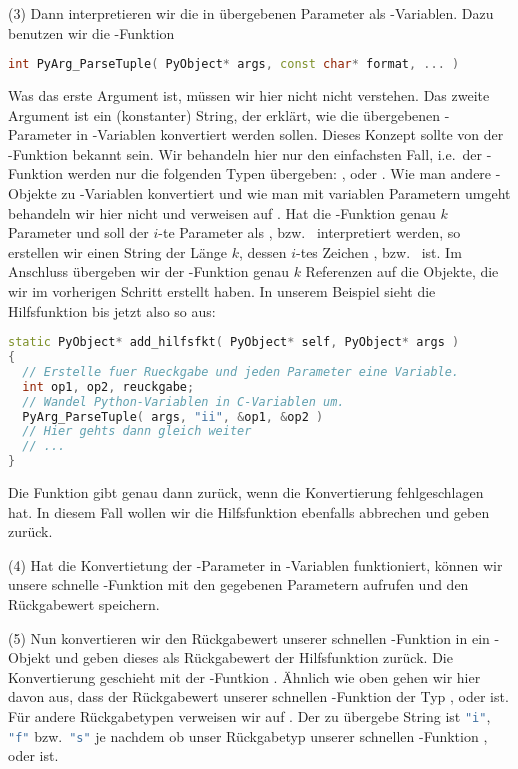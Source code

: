 (3) Dann interpretieren wir die in \Python übergebenen Parameter als \C-Variablen.
Dazu benutzen wir die \C-Funktion
\begin{lstlisting}[language=C++, style=CPP]
int PyArg_ParseTuple( PyObject* args, const char* format, ... )
\end{lstlisting}
Was das erste Argument ist, müssen wir hier nicht nicht verstehen.
Das zweite Argument ist ein (konstanter) String, der erklärt, wie die übergebenen \Python-Parameter in \C-Variablen konvertiert werden sollen.
Dieses Konzept sollte von der \C-Funktion  bekannt sein.
Wir behandeln hier nur den einfachsten Fall, i.e.\ der \Python-Funktion werden nur die folgenden Typen übergeben: ,  oder .
Wie man andere \Python-Objekte zu \C-Variablen konvertiert und wie man mit variablen Parametern umgeht behandeln wir hier nicht und verweisen auf \cite[Extending Python with C or C++; \S 1.7]{Python3}.
Hat die \Python-Funktion genau $k$ Parameter  und soll der $i$-te Parameter als ,  bzw.\  interpretiert werden,
so erstellen wir einen String der Länge $k$, dessen $i$-tes Zeichen ,  bzw.\  ist.
Im Anschluss übergeben wir der \C-Funktion  genau $k$ Referenzen auf die Objekte, die wir im vorherigen Schritt erstellt haben.
In unserem Beispiel sieht die Hilfsfunktion bis jetzt also so aus:
\begin{lstlisting}[language=C++, style=CPP]
static PyObject* add_hilfsfkt( PyObject* self, PyObject* args )
{
  // Erstelle fuer Rueckgabe und jeden Parameter eine Variable.
  int op1, op2, reuckgabe;
  // Wandel Python-Variablen in C-Variablen um.
  PyArg_ParseTuple( args, "ii", &op1, &op2 )
  // Hier gehts dann gleich weiter
  // ...
}
\end{lstlisting}
Die Funktion  gibt genau dann  zurück, wenn die Konvertierung fehlgeschlagen hat.
In diesem Fall wollen wir die Hilfsfunktion ebenfalls abbrechen und geben  zurück.

(4) Hat die Konvertietung der \Python-Parameter in \C-Variablen funktioniert, können wir unsere schnelle \C-Funktion mit den gegebenen Parametern aufrufen und den Rück\-ga\-be\-wert speichern.

(5) Nun konvertieren wir den Rückgabewert unserer schnellen \C-Funktion in ein \Python-Objekt und geben dieses als Rückgabewert der Hilfsfunktion zurück.
Die Konvertierung geschieht mit der \C-Funtkion .
Ähnlich wie oben gehen wir hier davon aus, dass der Rückgabewert unserer schnellen \C-Funktion der Typ ,  oder  ist.
Für andere Rückgabetypen verweisen wir auf \cite[Extending Python with C or C++; \S 1.9]{Python3}.
Der zu übergebe String ist \lstinline[language=C++,style=CPPinline]|"i"|, \lstinline[language=C++,style=CPPinline]|"f"| bzw.\ \lstinline[language=C++,style=CPPinline]|"s"|
je nachdem ob unser Rückgabetyp unserer schnellen \C-Funktion ,  oder  ist.

